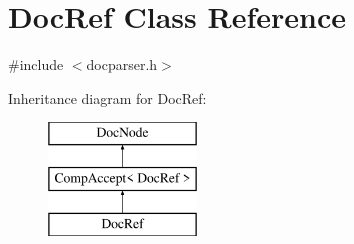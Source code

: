 \hypertarget{class_doc_ref}{}\section{Doc\+Ref Class Reference}
\label{class_doc_ref}


{\ttfamily \#include $<$docparser.\+h$>$}

Inheritance diagram for Doc\+Ref\+:\begin{figure}[H]
\begin{center}
\leavevmode
\includegraphics[height=3.000000cm]{class_doc_ref}
\end{center}
\end{figure}
